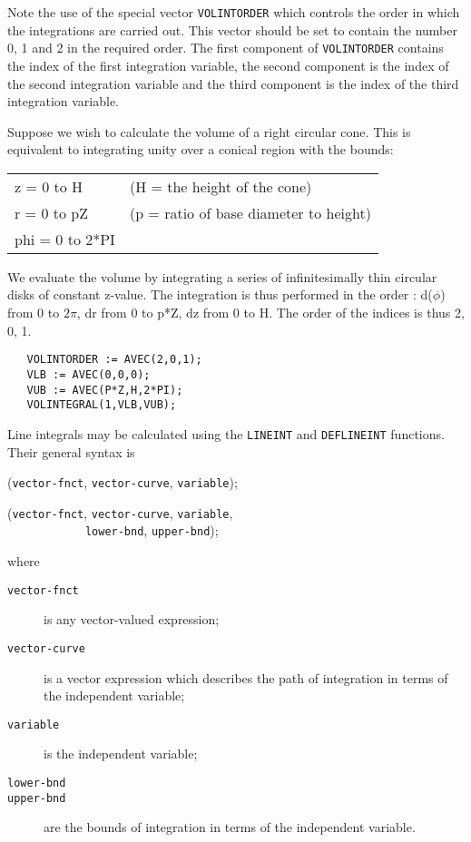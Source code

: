 \documentclass[11pt,letterpaper]{book}
\begin{document}
Note the use of the special vector {\tt VOLINTORDER} which controls
the order in which the integrations are carried out. This vector
should be set to contain the number 0, 1 and 2 in the required order.
The first component of {\tt VOLINTORDER} contains the index of the
first integration variable, the second component is the index of the
second integration variable and the third component is the index of
the third integration variable.

\example{}

Suppose we wish to calculate the volume of a right circular cone. This
is equivalent to integrating unity over a conical region with the
bounds:

\begin{tabular}{l l}
z = 0 to H  & (H = the height of the cone) \\
r = 0 to pZ & (p = ratio of base diameter to height) \\
phi = 0 to 2*PI & \\
\end{tabular}

We evaluate the volume by integrating a series of infinitesimally thin
circular disks of constant z-value. The integration is thus performed
in the order : d($\phi$) from 0 to $2\pi$, dr from 0 to p*Z, dz from 0 to H.
The order of the indices is thus 2, 0, 1.

{\small\begin{verbatim}
   VOLINTORDER := AVEC(2,0,1);
   VLB := AVEC(0,0,0);
   VUB := AVEC(P*Z,H,2*PI);
   VOLINTEGRAL(1,VLB,VUB);
\end{verbatim}}

Line integrals may be calculated using the {\tt LINEINT} and {\tt DEFLINEINT}
functions. Their general syntax is

({\tt vector-fnct}, {\tt vector-curve},
{\tt variable});

({\tt vector-fnct}, {\tt vector-curve},
{\tt variable},\\
\noindent\verb+            +{\tt lower-bnd}, {\tt upper-bnd});

\noindent where
\begin{description}
\item[{\tt vector-fnct}] is any vector-valued expression;
\item[{\tt vector-curve}] is a vector expression which describes the path of
integration in terms of the independent variable;
\item[{\tt variable}] is the independent variable;
\item[{\tt lower-bnd}]
\item[{\tt upper-bnd}] are the bounds of integration in terms of the
independent variable.
\end{description}
\end{document}
